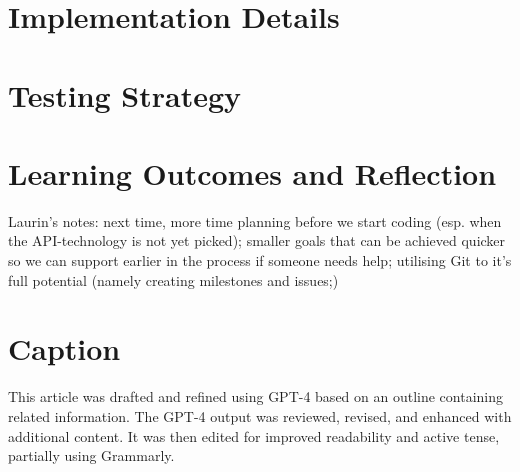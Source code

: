 \documentclass[a4paper, 11pt]{article}
\begin{document}


    \section{Implementation Details}\label{sec:implementation-details}



    \section{Testing Strategy}\label{sec:testing-strategy}



    \section{Learning Outcomes and Reflection}\label{sec:learning-outcomes-and-reflection}
    Laurin's notes: next time, more time planning before we start coding (esp. when the API-technology is not yet picked); smaller goals that can be achieved quicker so we can support earlier in the process if someone needs help; utilising Git to it's full potential (namely creating milestones and issues;)



    \section*{Caption}
    This article was drafted and refined using GPT-4 based on an outline containing related information. The GPT-4 output was reviewed, revised, and enhanced with additional content. It was then edited for improved readability and active tense, partially using Grammarly.
\end{document}
